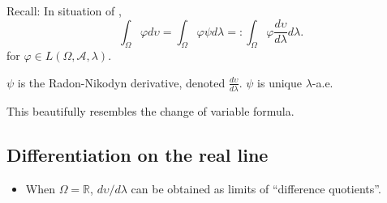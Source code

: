 \begin{remark}
	Recall: In situation of , 
	\[
		\int _\Omega \varphi d \upsilon = \int _\Omega \varphi \psi d \lambda =: \int _\Omega \varphi \frac{d \upsilon}{d\lambda} d\lambda
	.\] 
	for $\varphi \in L(\Omega, \mathcal{A}, \lambda)$.

	$\psi$ is the Radon-Nikodyn derivative, denoted  $\frac{d \upsilon}{d \lambda}$. $\psi$ is unique $\lambda$-a.e.

	This beautifully resembles the change of variable formula.
\end{remark}

\subsection{Differentiation on the real line}

\begin{itemize}
	\item When $\Omega = \mathbb{R}$, $d \upsilon / d \lambda$ can be obtained as limits of ``difference quotients''.

\end{itemize}

